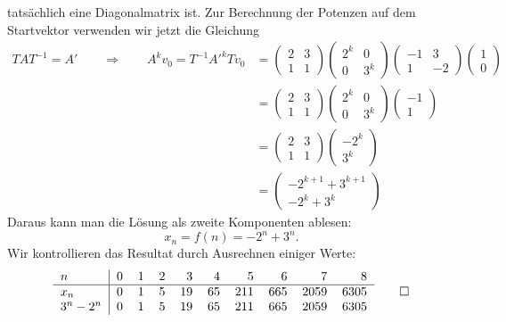 \begin{loesung}
\[\]
tatsächlich eine Diagonalmatrix ist.
Zur Berechnung der Potenzen auf dem Startvektor verwenden wir jetzt die 
Gleichung
\begin{align*}
TAT^{-1}
=
A'
\qquad\Rightarrow\qquad
A^kv_0
=
T^{-1}A'^kTv_0
&=
\begin{pmatrix}
2&3\\
1&1
\end{pmatrix}
\begin{pmatrix}
2^k& 0\\
 0 &3^k
\end{pmatrix}
\begin{pmatrix}
-1& 3\\
 1&-2
\end{pmatrix}
\begin{pmatrix}
1\\0
\end{pmatrix}
\\
&=
\begin{pmatrix}
2&3\\
1&1
\end{pmatrix}
\begin{pmatrix}
2^k& 0\\
 0 &3^k
\end{pmatrix}
\begin{pmatrix}
-1\\1
\end{pmatrix}
\\
&=
\begin{pmatrix}
2&3\\
1&1
\end{pmatrix}
\begin{pmatrix}
-2^k\\
 3^k
\end{pmatrix}
\\
&=
\begin{pmatrix}
-2^{k+1}+3^{k+1}\\
-2^k+3^k
\end{pmatrix}
\end{align*}
Daraus kann man die Lösung als zweite Komponenten ablesen:
\[
x_n=f(n)=-2^n+3^n.
\]
Wir kontrollieren das Resultat durch Ausrechnen einiger Werte:
\[
\begin{tabular}{l|rrrrrrrrr}
$n$&0&1&2&3&4&5&6&7&8\\
\hline
$x_n$&0&1&5&19&65&211&665&2059&6305\\
$3^n-2^n$&0&1&5&19&65&211&665&2059&6305\\
\end{tabular}
\qedhere
\]
\end{loesung}

